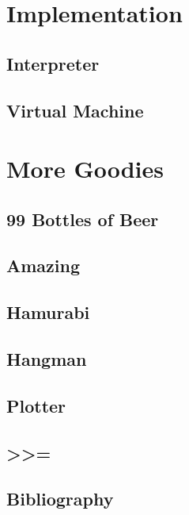 \documentclass[10pt, stock, openany, chapter]{memoir}
\newcommand\basicmbind{>\hspace*{-0.167em}>\hspace*{-0.167em}=}
\begin{document}
\part{Implementation}

\chapter{Interpreter}


\chapter{Virtual Machine}


\part{More Goodies}

\chapter{99 Bottles of Beer}


\chapter{Amazing}


\chapter{Hamurabi}


\chapter{Hangman}


\chapter{Plotter}


\chapter[Proof That Monad Laws Are Obeyed]{\basicmbind}


\chapter{Bibliography}

\end{document}
